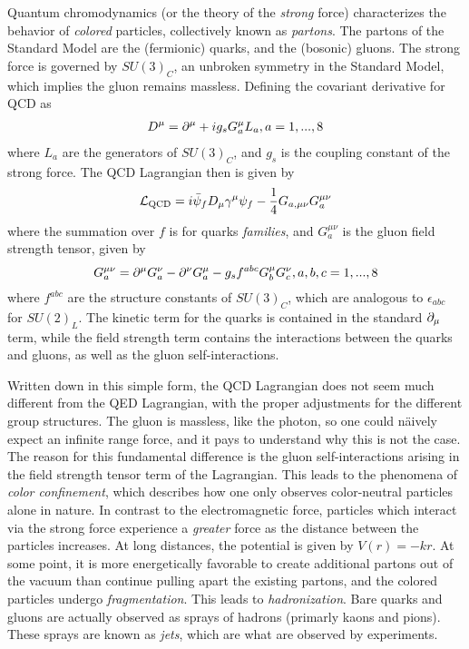Quantum chromodynamics (or the theory of the \textit{strong} force) characterizes the behavior of \textit{colored} particles, collectively known as \textit{partons}.
The partons of the Standard Model are the (fermionic) quarks, and the (bosonic) gluons.
The strong force is governed by $SU(3)_C$, an unbroken symmetry in the Standard Model, which implies the gluon remains massless.
Defining the covariant derivative for QCD as
\begin{align}
D^\mu = \partial^\mu + ig_s G^\mu_a L_a, a = 1,...,8
\end{align}
where $L_a$ are the generators of $SU(3)_C$, and $g_s$ is the coupling constant of the strong force.
The QCD Lagrangian then is given by
\begin{equation}
\mathcal{L}_{\text{QCD}} = i \bar{\psi}_f D_\mu \gamma^\mu \psi_f - \frac{1}{4} G_{a,\mu\nu} G_a^{\mu\nu}
\end{equation}
where the summation over $f$ is for quarks \textit{families}, and $ G_a^{\mu\nu}$ is the gluon field strength tensor, given by
\begin{equation}
G^{\mu\nu}_a = \partial^\mu G^\nu_a - \partial^\nu G^\mu_a - g_s f^{abc} G^\mu_b G^\nu_c, a,b,c = 1,...,8
\end{equation}
where $f^{abc}$ are the structure constants of $SU(3)_C$, which are analogous to $\epsilon_{abc}$ for $SU(2)_L$.
The kinetic term for the quarks is contained in the standard $\partial_\mu$ term, while the field strength term contains the interactions between the quarks and gluons, as well as the gluon self-interactions.

Written down in this simple form, the QCD Lagrangian does not seem much different from the QED Lagrangian, with the proper adjustments for the different group structures.
The gluon is massless, like the photon, so one could n\"aively expect an infinite range force, and it pays to understand why this is not the case.
The reason for this fundamental difference is the gluon self-interactions  arising in the field strength tensor term of the Lagrangian.
This leads to the phenomena of \textit{color confinement}, which describes how one only observes color-neutral particles alone in nature.
In contrast to the electromagnetic force, particles which interact via the strong force experience a \textit{greater} force as the distance between the particles increases.
At long distances, the potential is given by $V(r) = -kr$.
At some point, it is more energetically favorable to create additional partons out of the vacuum than continue pulling apart the existing partons, and the colored particles undergo \textit{fragmentation}.
This leads to \textit{hadronization}.
Bare quarks and gluons are actually observed as sprays of hadrons (primarly kaons and pions).
These sprays are known as \textit{jets}, which are what are observed by experiments.

